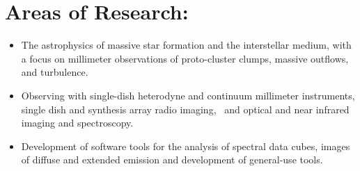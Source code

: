 \documentclass{article}
\begin{document}
\section*{Areas of Research: }
\begin{itemize}
    \item The astrophysics of massive star formation and the interstellar
        medium, with a focus on millimeter observations of proto-cluster
        clumps, massive outflows, and turbulence. 
    \item Observing with single-dish heterodyne and continuum millimeter
        instruments, single dish and synthesis array radio imaging,  and
        optical and near infrared imaging and spectroscopy. 
    \item Development of software tools for the analysis of spectral data
        cubes, images of diffuse and extended emission and development of
        general-use tools.
\end{itemize}
\end{document}
